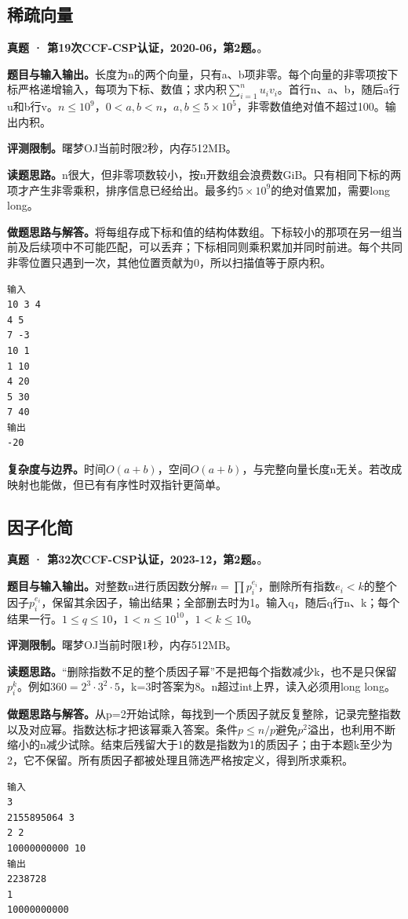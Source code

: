 \subsection{稀疏向量}
\textbf{真题 · 第19次CCF-CSP认证，2020-06，第2题。}。

\noindent\textbf{题目与输入输出。}长度为n的两个向量，只有a、b项非零。每个向量的非零项按下标严格递增输入，每项为下标、数值；求内积$\sum_{i=1}^n u_iv_i$。首行n、a、b，随后a行u和b行v。$n\le10^9$，$0<a,b<n$，$a,b\le5\times10^5$，非零数值绝对值不超过100。输出内积。

\noindent\textbf{评测限制。}曙梦OJ当前时限2秒，内存512MB。

\noindent\textbf{读题思路。}n很大，但非零项数较小，按n开数组会浪费数GiB。只有相同下标的两项才产生非零乘积，排序信息已经给出。最多约$5\times10^9$的绝对值累加，需要long long。

\noindent\textbf{做题思路与解答。}将每组存成下标和值的结构体数组。下标较小的那项在另一组当前及后续项中不可能匹配，可以丢弃；下标相同则乘积累加并同时前进。每个共同非零位置只遇到一次，其他位置贡献为0，所以扫描值等于原内积。
\begin{verbatim}
输入
10 3 4
4 5
7 -3
10 1
1 10
4 20
5 30
7 40
输出
-20
\end{verbatim}

\noindent\textbf{复杂度与边界。}时间$O(a+b)$，空间$O(a+b)$，与完整向量长度n无关。若改成映射也能做，但已有有序性时双指针更简单。
\subsection{因子化简}
\textbf{真题 · 第32次CCF-CSP认证，2023-12，第2题。}。

\noindent\textbf{题目与输入输出。}对整数n进行质因数分解$n=\prod p_i^{e_i}$，删除所有指数$e_i<k$的整个因子$p_i^{e_i}$，保留其余因子，输出结果；全部删去时为1。输入q，随后q行n、k；每个结果一行。$1\le q\le10$，$1<n\le10^{10}$，$1<k\le10$。

\noindent\textbf{评测限制。}曙梦OJ当前时限1秒，内存512MB。

\noindent\textbf{读题思路。}“删除指数不足的整个质因子幂”不是把每个指数减少k，也不是只保留$p_i^k$。例如$360=2^3\cdot3^2\cdot5$，k=3时答案为8。n超过int上界，读入必须用long long。

\noindent\textbf{做题思路与解答。}从p=2开始试除，每找到一个质因子就反复整除，记录完整指数以及对应幂。指数达标才把该幂乘入答案。条件$p\le n/p$避免$p^2$溢出，也利用不断缩小的n减少试除。结束后残留大于1的数是指数为1的质因子；由于本题k至少为2，它不保留。所有质因子都被处理且筛选严格按定义，得到所求乘积。
\begin{verbatim}
输入
3
2155895064 3
2 2
10000000000 10
输出
2238728
1
10000000000
\end{verbatim}

